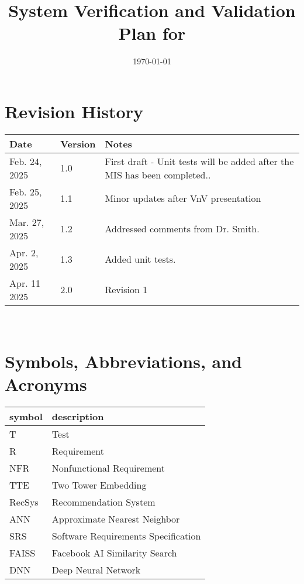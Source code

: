 \documentclass[12pt, titlepage]{article}
\begin{document}
\title{System Verification and Validation Plan for \progname{}} 
\author{\authname}
\date{\today}
	
\maketitle


\section*{Revision History}
\begin{tabularx}{\textwidth}{p{3cm}p{2cm}X}
\toprule {\bf Date} & {\bf Version} & {\bf Notes}\\
\midrule
Feb. 24, 2025 & 1.0 & First draft - Unit tests will be added after the MIS has been completed..\\
Feb. 25, 2025 & 1.1 & Minor updates after VnV presentation\\
Mar. 27, 2025 & 1.2 & Addressed comments from Dr. Smith.\\
Apr. 2, 2025 & 1.3 & Added unit tests.\\
Apr. 11 2025 & 2.0 & Revision 1\\
\bottomrule
\end{tabularx}

~\\

\newpage

\tableofcontents

\listoftables

\newpage

\section{Symbols, Abbreviations, and Acronyms}

\renewcommand{\arraystretch}{1.2}
\begin{tabular}{l l} 
  \toprule		
  \textbf{symbol} & \textbf{description}\\
  \midrule 
  T & Test\\
  R & Requirement\\
  NFR & Nonfunctional Requirement\\
  TTE & Two Tower Embedding\\
  RecSys & Recommendation System\\
  ANN & Approximate Nearest Neighbor\\
  SRS & Software Requirements Specification\\
  FAISS & Facebook AI Similarity Search\\
  DNN & Deep Neural Network\\
  \bottomrule
\end{tabular}\\
\end{document}
